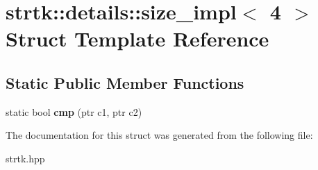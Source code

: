 \hypertarget{structstrtk_1_1details_1_1size__impl_3_014_01_4}{\section{strtk\-:\-:details\-:\-:size\-\_\-impl$<$ 4 $>$ Struct Template Reference}
\label{structstrtk_1_1details_1_1size__impl_3_014_01_4}
}
\subsection*{Static Public Member Functions}
\begin{DoxyCompactItemize}
\item 
\hypertarget{structstrtk_1_1details_1_1size__impl_3_014_01_4_ae8fda45d4188f2dfb0eea0983bd3c448}{static bool {\bfseries cmp} (ptr c1, ptr c2)}\label{structstrtk_1_1details_1_1size__impl_3_014_01_4_ae8fda45d4188f2dfb0eea0983bd3c448}

\end{DoxyCompactItemize}


The documentation for this struct was generated from the following file\-:\begin{DoxyCompactItemize}
\item 
strtk.\-hpp\end{DoxyCompactItemize}

